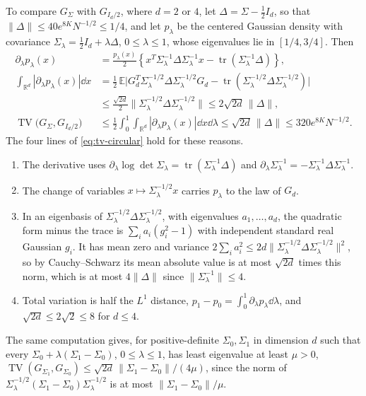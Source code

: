 To compare $G_\Sigma$ with $G_{I_d/2}$, where $d=2$ or $4$, let
$\Delta=\Sigma-\tfrac12I_d$, so that $\|\Delta\|\le40e^{8K}N^{-1/2}\le1/4$,
and let $p_\lambda$ be the centered Gaussian
density with covariance $\Sigma_\lambda=\tfrac12I_d+\lambda\Delta$,
$0\le\lambda\le1$, whose eigenvalues lie in $[1/4,3/4]$. Then
\begin{align}
 \partial_\lambda p_\lambda(x)
 &=\frac{p_\lambda(x)}2\left\{
   x^T\Sigma_\lambda^{-1}\Delta\Sigma_\lambda^{-1}x-\operatorname{tr}(\Sigma_\lambda^{-1}\Delta)
   \right\},\nonumber\\
 \int_{\mathbb R^d}|\partial_\lambda p_\lambda(x)|\dd x
 &=\frac12\,\mathbb E\bigl|G_d^T\Sigma_\lambda^{-1/2}\Delta\Sigma_\lambda^{-1/2}G_d
   -\operatorname{tr}(\Sigma_\lambda^{-1/2}\Delta\Sigma_\lambda^{-1/2})\bigr|\nonumber\\
 &\le\frac{\sqrt{2d}}2\|\Sigma_\lambda^{-1/2}\Delta\Sigma_\lambda^{-1/2}\|
 \le2\sqrt{2d}\,\|\Delta\|,\nonumber\\
 \operatorname{TV}\bigl(G_\Sigma,G_{I_d/2}\bigr)
 &\le\frac12\int_0^1\int_{\mathbb R^d}|\partial_\lambda p_\lambda(x)|\dd x\dd\lambda
 \le\sqrt{2d}\,\|\Delta\|
 \le320e^{8K}N^{-1/2}.\label{eq:tv-circular}
\end{align}
The four lines of \eqref{eq:tv-circular} hold for these reasons.
\begin{enumerate}
\item The derivative uses
$\partial_\lambda\log\det\Sigma_\lambda=\operatorname{tr}(\Sigma_\lambda^{-1}\Delta)$
and
$\partial_\lambda\Sigma_\lambda^{-1}=-\Sigma_\lambda^{-1}\Delta\Sigma_\lambda^{-1}$.
\item The change of variables $x\mapsto\Sigma_\lambda^{-1/2}x$ carries
$p_\lambda$ to the law of $G_d$.
\item In an eigenbasis of $\Sigma_\lambda^{-1/2}\Delta\Sigma_\lambda^{-1/2}$,
with eigenvalues $a_1,\ldots,a_d$, the quadratic form minus the trace is
$\sum_ia_i(g_i^2-1)$ with independent standard real Gaussian $g_i$. It has
mean zero and variance
$2\sum_ia_i^2\le2d\|\Sigma_\lambda^{-1/2}\Delta\Sigma_\lambda^{-1/2}\|^2$,
so by Cauchy--Schwarz its mean absolute value is at most $\sqrt{2d}$ times
this norm, which is at most $4\|\Delta\|$ since
$\|\Sigma_\lambda^{-1}\|\le4$.
\item Total variation is half the $L^1$ distance,
$p_1-p_0=\int_0^1\partial_\lambda p_\lambda\dd\lambda$, and
$\sqrt{2d}\le2\sqrt2\le8$ for $d\le4$.
\end{enumerate}
The same computation gives, for positive-definite $\Sigma_0,\Sigma_1$ in
dimension $d$ such that every $\Sigma_0+\lambda(\Sigma_1-\Sigma_0)$,
$0\le\lambda\le1$, has least eigenvalue at least $\mu>0$,
$\operatorname{TV}(G_{\Sigma_1},G_{\Sigma_0})\le\sqrt{2d}\,\|\Sigma_1-\Sigma_0\|/(4\mu)$,
since the norm of $\Sigma_\lambda^{-1/2}(\Sigma_1-\Sigma_0)\Sigma_\lambda^{-1/2}$
is at most $\|\Sigma_1-\Sigma_0\|/\mu$.

